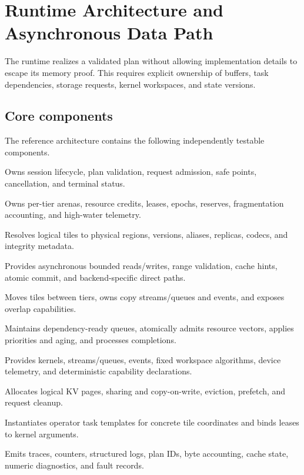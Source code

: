 \section{Runtime Architecture and Asynchronous Data Path}
\label{sec:runtime}

The runtime realizes a validated plan without allowing implementation details to escape its memory proof. This requires explicit ownership of buffers, task dependencies, storage requests, kernel workspaces, and state versions.

\subsection{Core components}

The reference architecture contains the following independently testable components.

\begin{description}[style=nextline]
  \item[\code{ExecutionEngine}] Owns session lifecycle, plan validation, request admission, safe points, cancellation, and terminal status.
  \item[\code{MemoryBroker}] Owns per-tier arenas, resource credits, leases, epochs, reserves, fragmentation accounting, and high-water telemetry.
  \item[\code{VirtualTensorManager}] Resolves logical tiles to physical regions, versions, aliases, replicas, codecs, and integrity metadata.
  \item[\code{TensorStore}] Provides asynchronous bounded reads/writes, range validation, cache hints, atomic commit, and backend-specific direct paths.
  \item[\code{TransferEngine}] Moves tiles between tiers, owns copy streams/queues and events, and exposes overlap capabilities.
  \item[\code{TaskScheduler}] Maintains dependency-ready queues, atomically admits resource vectors, applies priorities and aging, and processes completions.
  \item[\code{Backend}] Provides kernels, streams/queues, events, fixed workspace algorithms, device telemetry, and deterministic capability declarations.
  \item[\code{KVManager}] Allocates logical KV pages, sharing and copy-on-write, eviction, prefetch, and request cleanup.
  \item[\code{PlanExecutor}] Instantiates operator task templates for concrete tile coordinates and binds leases to kernel arguments.
  \item[\code{Telemetry}] Emits traces, counters, structured logs, plan IDs, byte accounting, cache state, numeric diagnostics, and fault records.
\end{description}

